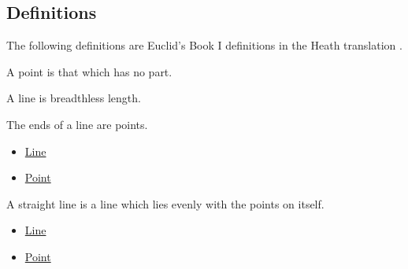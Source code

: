 \subsection*{Definitions}

The following definitions are Euclid's Book I definitions in the Heath
translation \citep[Book I, Definitions 1--23]{euclid-elements-heath}.

\begin{definition}[Point]
\label{def-euclid-point}
A point is that which has no part.
\end{definition}
\begin{lra-not-visible}
\NoLocalDependencies
\end{lra-not-visible}

\begin{definition}[Line]
\label{def-euclid-line}
A line is breadthless length.
\end{definition}
\begin{lra-not-visible}
\NoLocalDependencies
\end{lra-not-visible}

\begin{definition}
\label{def-euclid-ends-of-a-line}
The ends of a line are points.
\end{definition}
\begin{lra-not-visible}
\begin{dependencies}
\begin{itemize}
  \item \hyperref[def-euclid-line]{Line}
  \item \hyperref[def-euclid-point]{Point}
\end{itemize}
\end{dependencies}
\end{lra-not-visible}

\begin{definition}
\label{def-euclid-straight-line}
A straight line is a line which lies evenly with the points on itself.
\end{definition}
\begin{lra-not-visible}
\begin{dependencies}
\begin{itemize}
  \item \hyperref[def-euclid-line]{Line}
  \item \hyperref[def-euclid-point]{Point}
\end{itemize}
\end{dependencies}
\end{lra-not-visible}

